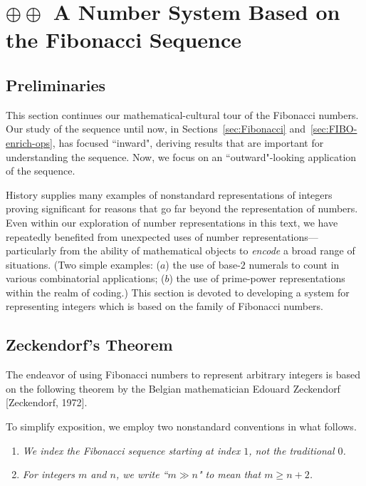 \section{$\oplus \oplus$ A Number System Based on the Fibonacci Sequence}
\label{sec:numerals-special-families}
\label{sec:Fibo-numbers}

\subsection{Preliminaries}
\label{sec:FIBO-num-intro}

This section continues our mathematical-cultural tour of the Fibonacci numbers.  Our study of the sequence until now, in Sections~\ref{sec:Fibonacci} and~\ref{sec:FIBO-enrich-ops}, has focused ``inward", deriving results that are important for understanding the sequence.  Now, we focus on an ``outward"-looking application of the sequence.

\medskip

History supplies many examples of nonstandard representations of integers proving significant for reasons that go far beyond the representation of numbers.  Even within our exploration of number representations in this text, we have repeatedly benefited from unexpected uses of number representations---particularly from the ability of mathematical objects to {\em encode} a broad range of situations.  (Two simple examples: ($a$) the use of base-$2$ numerals to count in various combinatorial applications; ($b$) the use of prime-power representations within the realm of coding.)  This section is devoted to developing a system for representing integers which is based on the family of Fibonacci numbers.

\subsection{Zeckendorf's Theorem}
\label{sec:Zeckendorf's-Theorem}

 

The endeavor of using Fibonacci numbers to represent arbitrary integers is based on the following theorem by the Belgian mathematician Edouard Zeckendorf  [Zeckendorf, 1972].

\medskip

To simplify exposition, we employ two nonstandard conventions in what follows.
\begin{enumerate}
\item
{\em We index the Fibonacci sequence starting at index $1$, not the traditional $0$.}
\item
{\em For integers $m$ and $n$, we write ``$m \gg n$" to mean that $m \geq n+2$.}
\end{enumerate}


